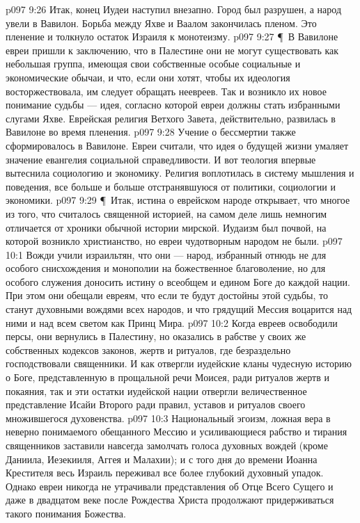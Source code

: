 \vs p097 9:26 Итак, конец Иудеи наступил внезапно. Город был разрушен, а народ увели в Вавилон. Борьба между Яхве и Ваалом закончилась пленом. Это пленение и толкнуло остаток Израиля к монотеизму.
\vs p097 9:27 \P\ В Вавилоне евреи пришли к заключению, что в Палестине они не могут существовать как небольшая группа, имеющая свои собственные особые социальные и экономические обычаи, и что, если они хотят, чтобы их идеология восторжествовала, им следует обращать неевреев. Так и возникло их новое понимание судьбы --- идея, согласно которой евреи должны стать избранными слугами Яхве. Еврейская религия Ветхого Завета, действительно, развилась в Вавилоне во время пленения.
\vs p097 9:28 Учение о бессмертии также сформировалось в Вавилоне. Евреи считали, что идея о будущей жизни умаляет значение евангелия социальной справедливости. И вот теология впервые вытеснила социологию и экономику. Религия воплотилась в систему мышления и поведения, все больше и больше отстранявшуюся от политики, социологии и экономики.
\vs p097 9:29 \P\ Итак, истина о еврейском народе открывает, что многое из того, что считалось священной историей, на самом деле лишь немногим отличается от хроники обычной истории мирской. Иудаизм был почвой, на которой возникло христианство, но евреи чудотворным народом не были.
\vs p097 10:1 Вожди учили израильтян, что они --- народ, избранный отнюдь не для особого снисхождения и монополии на божественное благоволение, но для особого служения доносить истину о всеобщем и едином Боге до каждой нации. При этом они обещали евреям, что если те будут достойны этой судьбы, то станут духовными вождями всех народов, и что грядущий Мессия воцарится над ними и над всем светом как Принц Мира.
\vs p097 10:2 Когда евреев освободили персы, они вернулись в Палестину, но оказались в рабстве у своих же собственных кодексов законов, жертв и ритуалов, где безраздельно господствовали священники. И как отвергли иудейские кланы чудесную историю о Боге, представленную в прощальной речи Моисея, ради ритуалов жертв и покаяния, так и эти остатки иудейской нации отвергли величественное представление Исайи Второго ради правил, уставов и ритуалов своего множившегося духовенства.
\vs p097 10:3 Национальный эгоизм, ложная вера в неверно понимаемого обещанного Мессию и усиливающиеся рабство и тирания священников заставили навсегда замолчать голоса духовных вождей (кроме Даниила, Иезекииля, Аггея и Малахии); и с того дня до времени Иоанна Крестителя весь Израиль переживал все более глубокий духовный упадок. Однако евреи никогда не утрачивали представления об Отце Всего Сущего и даже в двадцатом веке после Рождества Христа продолжают придерживаться такого понимания Божества.
